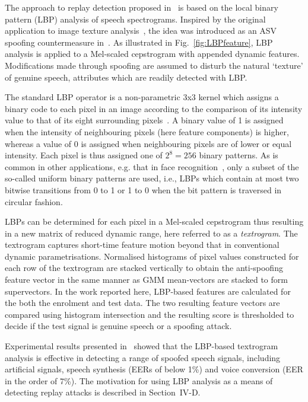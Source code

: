 The approach to replay detection proposed in~\cite{Alegre2014} is based on the local binary pattern (LBP) analysis of speech spectrograms.  
Inspired by the original application to image texture analysis~\cite{Ojala2002}, the idea was introduced as an ASV spoofing countermeasure in~\cite{Alegre2013a}.  
As illustrated in Fig.~\ref{fig:LBPfeature}, LBP analysis is applied to a Mel-scaled cepstrogram with appended dynamic features.  Modifications made through spoofing are assumed to disturb the natural `texture' of genuine speech, attributes which are readily detected with LBP.   

The standard LBP operator is a non-parametric 3x3 kernel which assigns a binary code to each pixel in an image according to the comparison of its intensity value to that of its eight surrounding pixels~\cite{Ojala2002}. 
A binary value of 1 is assigned when the intensity of neighbouring pixels (here feature components) is higher, whereas a value of 0 is assigned when neighbouring pixels are of lower or equal intensity. Each pixel is thus assigned one of $2^8=256$ binary patterns. As is common in other applications, e.g. that in face recognition~\cite{Ahonen2006}, only a subset of the so-called uniform binary patterns are used, i.e.,  LBPs which contain at most two bitwise transitions from 0 to 1 or 1 to 0 when the bit pattern is traversed in circular fashion.

LBPs can be determined for each pixel in a Mel-scaled cepstrogram thus resulting in a new matrix of reduced dynamic range, here referred to as a \emph{textrogram}.  
The textrogram captures short-time feature motion beyond that in conventional dynamic parametrisations.  
Normalised histograms of pixel values constructed for each row of the textrogram   are stacked vertically to obtain the anti-spoofing feature vector in the same manner as GMM mean-vectors are stacked to form supervectors.  
In the work reported here, LBP-based features are calculated for the both the enrolment and test data.  The two resulting feature vectors are compared using histogram intersection and the resulting score is thresholded to decide if the test signal is genuine speech or a spoofing attack.

Experimental results presented in~\cite{Alegre2013a} showed that the LBP-based textrogram analysis is effective in detecting a range of spoofed speech signals, including artificial signals, speech synthesis (EERs of below 1\%) and voice conversion (EER in the order of 7\%).  The motivation for using LBP analysis as a means of detecting replay attacks is described in Section~IV-D.
